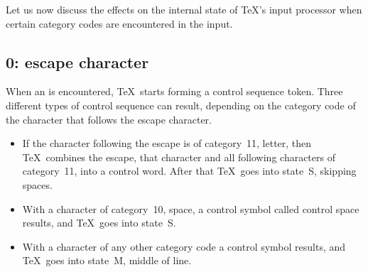 \documentclass{book}
\begin{document}
Let us now discuss the effects on the internal state
of \TeX's input processor when
certain category codes are encountered in the input. 

\subsection{0: escape character}

When an  is encountered,
\TeX\ starts forming a control sequence token.
Three different types of control sequence can result,
depending on the category code of the character that
follows the escape character.

\begin{itemize}\item
If the character following the escape is of category~11,
letter, then \TeX\ combines the escape,
that character and all following
characters of category~11, into a control word.
After that \TeX\
goes into state~{\italic S}, skipping spaces.
\item
With a character of category~10, space, a control
symbol called control space results, and \TeX\ goes into
state~{\italic S}.
\item
With a character of any other category code 
a control symbol results, and \TeX\ goes into state~{\italic M},
middle of line.
\end{itemize}
\end{document}
